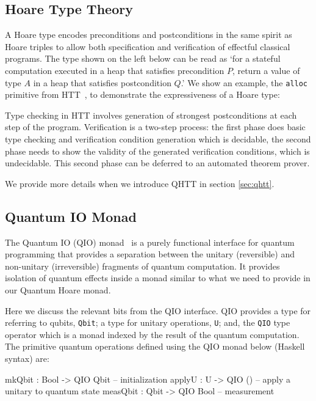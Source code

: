 \documentclass[acmsmall,nonacm,timestamp]{acmart}
\begin{document}
\subsection{Hoare Type Theory}
\label{sec:htt}
A Hoare type encodes preconditions and postconditions in the same spirit as Hoare triples to allow both specification and verification of effectful classical programs. The type shown on the left below can be read as `for a stateful computation executed in a heap that satisfies precondition $P$, return a value of type $A$ in a heap that satisfies postcondition $Q$.' We show an example, the \texttt{alloc} primitive from HTT~\cite{nanevski_hoare_2008}, to demonstrate the expressiveness of a Hoare type:

Type checking in HTT involves generation of strongest postconditions at each step of the program. Verification is a two-step process: the first phase does basic type checking and verification condition generation which is decidable, the second phase needs to show the validity of the generated verification conditions, which is undecidable. This second phase can be deferred to an automated theorem prover.

We provide more details when we introduce QHTT in section \cref{sec:qhtt}.

\subsection{Quantum IO Monad}
\label{sec:qio}

The Quantum IO (QIO) monad~\cite{qio} is a purely functional interface for quantum programming that provides a separation between the unitary (reversible) and non-unitary (irreversible) fragments of quantum computation. It provides isolation of quantum effects inside a monad similar to what we need to provide in our Quantum Hoare monad.

Here we discuss the relevant bits from the QIO interface. QIO provides a type for referring to qubits, \texttt{Qbit}; a type for unitary operations, \texttt{U}; and, the \texttt{QIO} type operator which is a monad indexed by the result of the quantum computation. The primitive quantum operations defined using the QIO monad below (Haskell syntax) are:
\begin{QCode}
mkQbit : Bool -> QIO Qbit       -- initialization
applyU : U -> QIO ()            -- apply a unitary to quantum state
measQbit : Qbit -> QIO Bool     -- measurement
\end{QCode}
\end{document}
